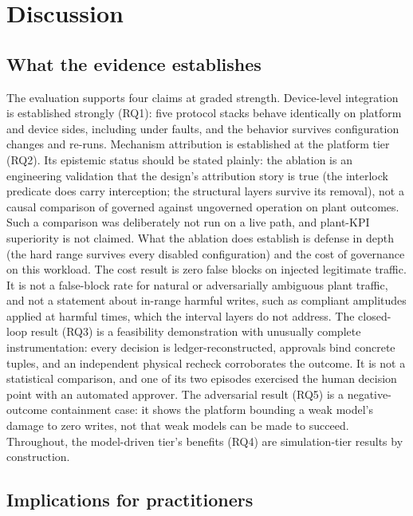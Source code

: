 \section{Discussion}
\label{sec:discussion}

\subsection{What the evidence establishes}
\label{sec:discussion-establishes}

The evaluation supports four claims at graded strength. Device-level
integration is established strongly (RQ1): five protocol stacks behave
identically on platform and device sides, including under faults, and the
behavior survives configuration changes and re-runs. Mechanism
attribution is established at the platform tier (RQ2). Its
epistemic status should be stated plainly: the ablation is an engineering
validation that the design's attribution story is true (the interlock
predicate does carry interception; the structural layers survive its
removal), not a causal comparison of governed against ungoverned
operation on plant outcomes. Such a comparison was deliberately not run
on a live path, and plant-KPI superiority is not claimed. What the
ablation does establish is defense in depth (the hard range survives
every disabled configuration) and the cost of governance on this
workload. The cost result is zero false blocks on injected legitimate
traffic. It is not a false-block rate for natural or adversarially
ambiguous plant traffic, and not a statement about in-range harmful
writes, such as compliant amplitudes applied at harmful times, which the
interval layers do not address. The closed-loop result (RQ3) is a feasibility demonstration
with unusually complete instrumentation: every decision is
ledger-reconstructed, approvals bind concrete tuples, and an independent
physical recheck corroborates the outcome. It is not a statistical
comparison, and one of its two episodes exercised the human decision
point with an automated approver. The adversarial result (RQ5) is a
negative-outcome containment case: it shows the platform bounding a weak
model's damage to zero writes, not that weak models can be made to
succeed. Throughout, the model-driven tier's benefits (RQ4) are
simulation-tier results by construction.

\subsection{Implications for practitioners}
\label{sec:discussion-practitioners}

